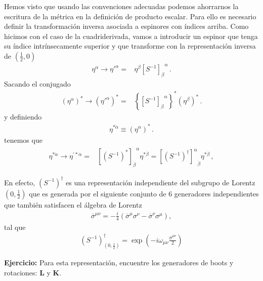 \begin{frame}
Hemos visto que usando las convenciones adecuadas podemos ahorrarnos
la escritura de la métrica en la definición de producto escalar.
%
Para ello es necesario definir la transformación inversa asociada a
espinores con índices arriba. Como hicimos con el caso de la cuadriderivada, vamos a introducir un espinor que tenga su índice intrínsecamente superior y que transforme con la representación inversa de $(\frac{1}{2},0)$
\begin{align*}
  \eta^{\alpha}\to {\eta'}^{\alpha} =&\eta^\beta{\left[  S^{-1}  \right]_{\beta}}^{\alpha}\,.
\end{align*}
Sacando el conjugado
\begin{align}
 \left( \eta^{\alpha} \right)^{*}\to \left( {\eta'}^{\alpha} \right)^{*} =&\left\{ {\left[  S^{-1}  \right]_{\beta}}^{\alpha} \right\}^{*} \left( \eta^\beta \right)^{*}\,.
\end{align}
y definiendo
\begin{align}
\eta^{*\dot{\alpha}}\equiv  \left( \eta^{\alpha} \right)^{*}\,.
\end{align}
tenemos que
\begin{align*}
  \eta^{*\dot{\alpha}}\to \eta^{\prime *\dot{\alpha}}
  =& {\left[ \left( S^{-1} \right)^{*} \right]_{\dot{\beta}}}^{\dot{\alpha}}\eta^{*\dot{\beta}}={\left[ \left( S^{-1} \right)^{\dagger} \right]^{\dot{\alpha}}}_{\dot{\beta}}\eta^{*\dot{\beta}}\,,
\end{align*}

En efecto, $\left( S^{-1} \right)^{\dagger}$ es una representación independiente del subgrupo de Lorentz $(0,\frac{1}{2})$ que es generada por el siguiente conjunto de 6 generadores independientes que también satisfacen el álgebra de Lorentz
\begin{align*}
  \overline{\sigma}^{\mu\nu}=-\frac{i}{4} \left( \overline{\sigma}^{\mu}\sigma^{\nu}-\overline{\sigma}^{\nu}\sigma^{\mu} \right),
\end{align*}
tal que
\begin{align*}
\left( S^{-1} \right)^{\dagger}_{(0,\frac{1}{2})}=\exp \left( -i \omega_{\mu\nu} \frac{\overline{\sigma}^{\mu\nu}}{2} \right)
\end{align*}

\textbf{Ejercicio:} Para esta representación, encuentre los generadores de boots y rotaciones: $\boldsymbol{L}$ y $\boldsymbol{K}$.

\bigskip


\end{frame}


